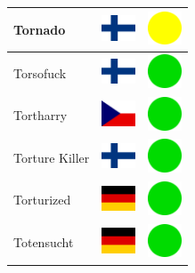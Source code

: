\documentclass[12pt, a4paper, twoside]{report}
\begin{document}
\begin{center}
\begin{longtable}{|p{5cm}|p{2cm}|p{2cm}|}
 Tornado                                                    & \includegraphics[width=1cm]{../4x3/fi} &   \includegraphics[width=1cm]{../likes/m} \\ \hline
 Torsofuck                                                  & \includegraphics[width=1cm]{../4x3/fi} &   \includegraphics[width=1cm]{../likes/y} \\ \hline
 Tortharry                                                  & \includegraphics[width=1cm]{../4x3/cz} &   \includegraphics[width=1cm]{../likes/y} \\ \hline
 Torture Killer                                             & \includegraphics[width=1cm]{../4x3/fi} &   \includegraphics[width=1cm]{../likes/y} \\ \hline
 Torturized                                                 & \includegraphics[width=1cm]{../4x3/de} &   \includegraphics[width=1cm]{../likes/y} \\ \hline
 Totensucht                                                 & \includegraphics[width=1cm]{../4x3/de} &   \includegraphics[width=1cm]{../likes/y} \\ \hline

\end{longtable}
\end{center}
\end{document}
